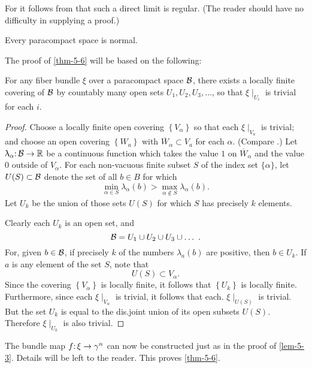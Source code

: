 For it follows from \cite[\S~18.4]{82} that such a direct limit is regular. (The reader should have no difficulty in supplying a proof.)
\begin{theorem}[Dieudonné]\label{thm-5-11}
	Every paracompact space is normal.
\end{theorem}
The proof of \cref{thm-5-6} will be based on the following:
\begin{lemma}\label{lem-5-9}
	For any fiber bundle $\xi$ over a paracompact space $\mathcal{B} $, there exists a locally finite covering of $\mathcal{B} $ by countably many open sets $U_{1}, U_{2}, U_{3}, \dots$, so that $\xi \mid_{ U_{i}}$ is trivial for each $ i $.
\end{lemma} 
\begin{proof}
	Choose a locally finite open covering $\left\{V_{\alpha}\right\}$ so that each $\xi \mid _{V_{a}}$ is trivial; and choose an open covering $\left\{W_{a}\right\}$ with $\overline{W}_{\alpha} \subset V_{a}$ for each $\alpha$. (Compare \cite[p.~171]{41}.) Let $\map{\lambda_{\alpha}}{\B }{\R} $ be a continuous function which takes the value $1$ on $\overline{W}_{\alpha}$ and the value $0$ outside of $V_{\alpha} $. For each non-vacuous finite subset $S$ of the index set $\{\alpha\}$, let $U(S) \subset \mathcal{B} $ denote the set of all $b \in B$ for which
	\[
	\min_{\alpha \in S} \lambda_{\alpha}(b)>\max_{\alpha \notin S} \lambda_{\alpha}(b).
	\]
	Let $U_{k}$ be the union of those sets $U(S)$ for which $S$ has precisely $k$ elements.
	
	Clearly each $U_{k}$ is an open set, and
	\[
	\mathcal{B} =U_{1}\cup U_{2} \cup U_{3} \cup \dots\ .
	\]
	For, given $b \in \mathcal{B} $, if precisely $k$ of the numbers $\lambda_{a}(b)$  are positive, then $b \in U_{k} $. If $a$ is any element of the set $S$, note that
	\[
	U(S) \subset V_{\alpha}.
	\]
	Since the covering $\left\{V_{\alpha}\right\}$ is locally finite, it follows that $\left\{U_{k}\right\}$ is locally finite. Furthermore, since each $\xi\mid _{V_{\alpha}}$ is trivial, it follows that each. $\xi \mid _{U(S)}$ is trivial. But the set $U_{k}$ is equal to the dis.joint union of its open subsets $U(S) $. Therefore $\xi \mid _{U_{k}}$ is also trivial.
\end{proof}

The bundle map $\map{f}{\xi}{\gamma^{n}}$ can now be constructed just as in the proof of \cref{lem-5-3}. Details will be left to the reader. This proves \cref{thm-5-6}.

